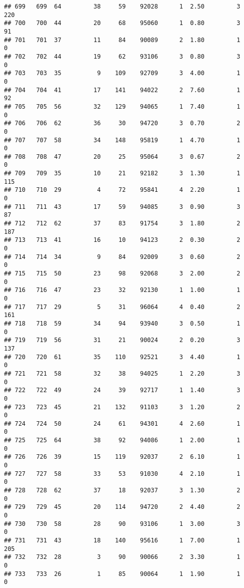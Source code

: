 \documentclass[
]{article}
\begin{document}
\begin{verbatim}
## 699   699  64         38     59    92028      1  2.50         3      220
## 700   700  44         20     68    95060      1  0.80         3       91
## 701   701  37         11     84    90089      2  1.80         1        0
## 702   702  44         19     62    93106      3  0.80         3        0
## 703   703  35          9    109    92709      3  4.00         1        0
## 704   704  41         17    141    94022      2  7.60         1       92
## 705   705  56         32    129    94065      1  7.40         1        0
## 706   706  62         36     30    94720      3  0.70         2        0
## 707   707  58         34    148    95819      1  4.70         1        0
## 708   708  47         20     25    95064      3  0.67         2        0
## 709   709  35         10     21    92182      3  1.30         1      115
## 710   710  29          4     72    95841      4  2.20         1        0
## 711   711  43         17     59    94085      3  0.90         3       87
## 712   712  62         37     83    91754      3  1.80         2      187
## 713   713  41         16     10    94123      2  0.30         2        0
## 714   714  34          9     84    92009      3  0.60         2        0
## 715   715  50         23     98    92068      3  2.00         2        0
## 716   716  47         23     32    92130      1  1.00         1        0
## 717   717  29          5     31    96064      4  0.40         2      161
## 718   718  59         34     94    93940      3  0.50         1        0
## 719   719  56         31     21    90024      2  0.20         3      137
## 720   720  61         35    110    92521      3  4.40         1        0
## 721   721  58         32     38    94025      1  2.20         3        0
## 722   722  49         24     39    92717      1  1.40         3        0
## 723   723  45         21    132    91103      3  1.20         2        0
## 724   724  50         24     61    94301      4  2.60         1        0
## 725   725  64         38     92    94086      1  2.00         1        0
## 726   726  39         15    119    92037      2  6.10         1        0
## 727   727  58         33     53    91030      4  2.10         1        0
## 728   728  62         37     18    92037      3  1.30         2        0
## 729   729  45         20    114    94720      2  4.40         2        0
## 730   730  58         28     90    93106      1  3.00         3        0
## 731   731  43         18    140    95616      1  7.00         1      205
## 732   732  28          3     90    90066      2  3.30         1        0
## 733   733  26          1     85    90064      1  1.90         1        0

\end{verbatim}
\end{document}
